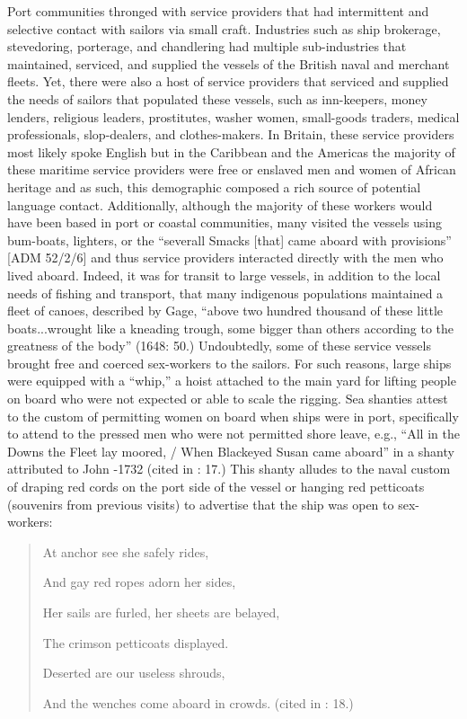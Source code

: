 Port communities thronged with service providers that had intermittent and selective contact with sailors via small craft. Industries such as ship brokerage, stevedoring, porterage, and chandlering had multiple sub-industries that maintained, serviced, and supplied the vessels of the British naval and merchant fleets. Yet, there were also a host of service providers that serviced and supplied the needs of sailors that populated these vessels, such as inn-keepers, money lenders, religious leaders, prostitutes, washer women, small-goods traders, medical professionals, slop-dealers, and clothes-makers. In Britain, these service providers most likely spoke English but in the Caribbean and the Americas the majority of these maritime service providers were free or enslaved men and women of African heritage \citep[259]{Jarvis2010} and as such, this demographic composed a rich source of potential language contact. Additionally, although the majority of these workers would have been based in port or coastal communities, many visited the vessels using bum-boats, lighters, or the “severall Smacks [that] came aboard with provisions” [ADM 52/2/6] and thus service providers interacted directly with the men who lived aboard. Indeed, it was for transit to large vessels, in addition to the local needs of fishing and transport, that many indigenous populations maintained a fleet of canoes, described by Gage, “above two hundred thousand of these little boats...wrought like a kneading trough, some bigger than others according to the greatness of the body” (1648: 50.) Undoubtedly, some of these service vessels brought free and coerced sex-workers to the sailors. For such reasons, large ships were equipped with a “whip,” a hoist attached to the main yard for lifting people on board who were not expected or able to scale the rigging. Sea shanties attest to the custom of permitting women on board when ships were in port, specifically to attend to the pressed men who were not permitted shore leave, e.g.,  “All in the Downs the Fleet lay moored, / When Blackeyed Susan came aboard” in a shanty attributed to John \citealt{Gay1685}-1732 (cited in \citealt{Hugill1969}: 17.) This shanty alludes to the naval custom of draping red cords on the port side of the vessel or hanging red petticoats (souvenirs from previous visits) to advertise that the ship was open to sex-workers: 

\begin{quotation}
At anchor see she safely rides, 

And gay red ropes adorn her sides, 

Her sails are furled, her sheets are belayed, 

The crimson petticoats displayed. 

Deserted are our useless shrouds, 

And the wenches come aboard in crowds. (cited in \citealt{Hugill1969}: 18.)\end{quotation}

